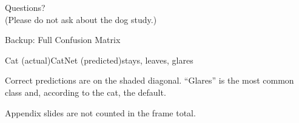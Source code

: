 \documentclass[10pt,aspectratio=169,xcolor=table]{beamer}
\begin{document}
\begin{frame}[standout]
  Questions?\\[0.5em]
  {\normalsize (Please do not ask about the dog study.)}
\end{frame}

\appendix

\begin{frame}{Backup: Full Confusion Matrix}
  \centering
  \begin{confusionmatrix}{Cat (actual)}{CatNet (predicted)}{stays, leaves, glares}
  \end{confusionmatrix}
  \bigskip

  Correct predictions are on the shaded diagonal. ``Glares'' is the most common
  class and, according to the cat, the default.\par\medskip
  {\small Appendix slides are not counted in the frame total.}
\end{frame}

\end{document}
